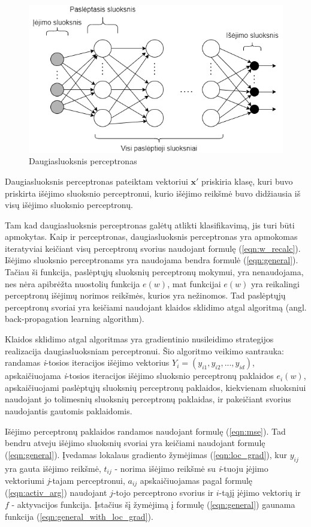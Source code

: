 \begin{figure}[H]
	\centering
	\includegraphics[scale=0.5]{img/neural_network.png}
	\caption{Daugiasluoksnis perceptronas}
	\label{img:nn}
\end{figure}

Daugiasluoksnis perceptronas pateiktam vektoriui $\boldsymbol{x}'$ priskiria klasę, kuri buvo priskirta išėjimo sluoksnio perceptronui, kurio išėjimo reikšmė buvo didžiausia iš visų išėjimo sluoksnio perceptronų.

Tam kad daugiasluoksnis perceptronas galėtų atlikti klasifikavimą, jis turi būti apmokytas. Kaip ir perceptronas, daugiasluoksnis perceptronas yra apmokomas iteratyviai keičiant visų perceptronų svorius naudojant formulę (\ref{eqn:w_recalc}). Išėjimo sluoksnio perceptronams yra naudojama bendra formulė (\ref{eqn:general}). Tačiau ši funkcija, paslėptųjų sluoksnių perceptronų mokymui, yra nenaudojama, nes nėra apibrėžta nuostolių funkcija $e(w)$, mat funkcijai $e(w)$ yra reikalingi perceptronų išėjimų norimos reikšmės, kurios yra nežinomos. Tad paslėptųjų perceptronų svoriai yra keičiami naudojant klaidos sklidimo atgal algoritmą (angl. back-propagation learning algorithm).

Klaidos sklidimo atgal algoritmas yra gradientinio nusileidimo strategijos realizacija daugiasluoksniam perceptronui. Šio algoritmo veikimo santrauka: randamas \textit{i}-tosios iteracijos išėjimo vektorius $Y_i = (y_{i1}, y_{i2}, ..., y_{id})$, apskaičiuojama \textit{i}-tosios iteracijos išėjimo sluoksnio perceptronų paklaidos $e_i(w)$, apskaičiuojami paslėptųjų sluoksnių perceptronų paklaidos, kiekvienam sluoksniui naudojant jo tolimesnių sluoksnių perceptronų paklaidas, ir pakeičiant svorius naudojantis gautomis paklaidomis.

Išėjimo perceptronų paklaidos randamos naudojant formulę (\ref{eqn:mse}). Tad bendru atveju išėjimo sluoksnių svoriai yra keičiami naudojant formulę (\ref{eqn:general}). Įvedamas lokalaus gradiento žymėjimas (\ref{eqn:loc_grad}), kur $y_{ij}$ yra gauta išėjimo reikšmė, $t_{ij}$ - norima išėjimo reikšmė su \textit{i}-tuoju įėjimo vektoriumi \textit{j}-tajam perceptronui, $a_{ij}$ apskaičiuojamas pagal formulę (\ref{eqn:activ_arg}) naudojant $j$-tojo perceptrono svorius ir $i$-tąjį įėjimo vektorių ir $f$ - aktyvacijos funkcija. Įstačius šį žymėjimą į formulę (\ref{eqn:general}) gaunama funkcija (\ref{eqn:general_with_loc_grad}).

